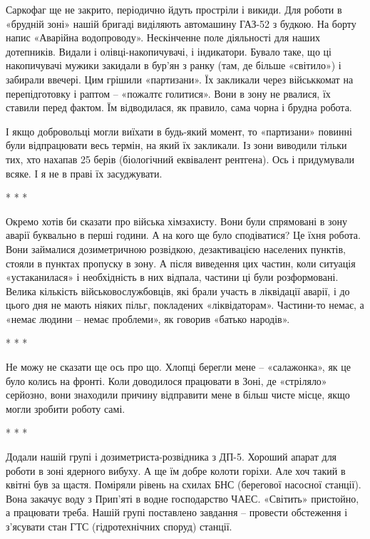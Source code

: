 
Саркофаг ще не закрито, періодично йдуть простріли і викиди. Для роботи в
«брудній зоні» нашій бригаді виділяють автомашину ГАЗ-52 з будкою. На борту
напис «Аварійна водопроводу». Нескінченне поле діяльності для наших дотепників.
Видали і олівці-накопичувачі, і індикатори. Бувало таке, що ці накопичувачі
мужики закидали в бур'ян з ранку (там, де більше «світило») і забирали ввечері.
Цим грішили «партизани». Їх закликали через військкомат на перепідготовку і
раптом – «пожалтє голитися». Вони в зону не рвалися, їх ставили перед фактом.
Їм відводилася, як правило, сама чорна і брудна робота. 


І якщо добровольці могли виїхати в будь-який момент, то «партизани» повинні
були відпрацювати весь термін, на який їх закликали. Із зони виводили тільки
тих, хто нахапав 25 берів (біологічний еквівалент рентгена). Ось і придумували
всяке. І я не в праві їх засуджувати.

* * *

Окремо хотів би сказати про війська хімзахисту. Вони були спрямовані в зону
аварії буквально в перші години. А на кого ще було сподіватися? Це їхня робота.
Вони займалися дозиметричною розвідкою, дезактивацією населених пунктів, стояли
в пунктах пропуску в зону. А після виведення цих частин, коли ситуація
«устаканилася» і необхідність в них відпала, частини ці були розформовані.
Велика кількість військовослужбовців, які брали участь в ліквідації аварії, і
до цього дня не мають ніяких пільг, покладених «ліквідаторам». Частини-то
немає, а «немає людини – немає проблеми», як говорив «батько народів».

* * *

Не можу не сказати ще ось про що. Хлопці берегли мене – «салажонка», як це було
колись на фронті. Коли доводилося працювати в Зоні, де «стріляло» серйозно,
вони знаходили причину відправити мене в більш чисте місце, якщо могли зробити
роботу самі.

* * *

Додали нашій групі і дозиметриста-розвідника з ДП-5. Хороший апарат для роботи
в зоні ядерного вибуху. А ще їм добре колоти горіхи. Але хоч такий в квітні був
за щастя. Поміряли рівень на схилах БНС (берегової насосної станції). Вона
закачує воду з Прип'яті в водне господарство ЧАЕС. «Світить» пристойно, а
працювати треба. Нашій групі поставлено завдання – провести обстеження і
з'ясувати стан ГТС (гідротехнічних споруд) станції.

